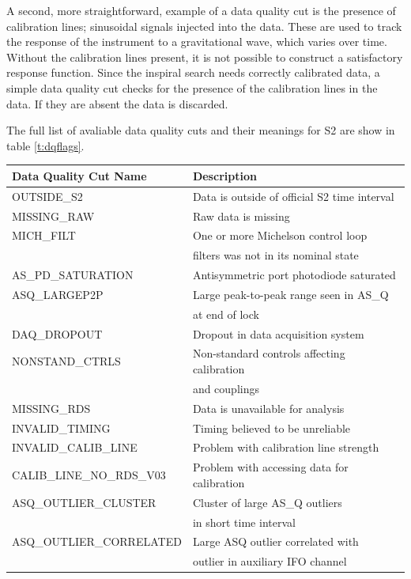 A second, more straightforward, example of a data quality cut is the presence
of calibration lines; sinusoidal signals injected into the data. These are
used to track the response of the instrument to a gravitational wave, which
varies over time. Without the calibration lines present, it is not possible to
construct a satisfactory response function. Since the inspiral search needs
correctly calibrated data, a simple data quality cut checks for the presence of
the calibration lines in the data. If they are absent the data is discarded.

The full list of avaliable data quality cuts and their meanings for S2 are
show in table \ref{t:dqflags}.

\begin{table}
\begin{center}
\begin{tabular}{ll}
Data Quality Cut Name & Description \\\hline
OUTSIDE\_S2   &Data is outside of official S2 time interval \\
MISSING\_RAW  &Raw data is missing \\
MICH\_FILT    &One or more Michelson control loop \\
&filters was not in its nominal state \\
AS\_PD\_SATURATION & Antisymmetric port photodiode saturated \\
ASQ\_LARGEP2P      & Large peak-to-peak range seen in AS\_Q \\
&at end of lock \\
DAQ\_DROPOUT       & Dropout in data acquisition system \\
NONSTAND\_CTRLS    & Non-standard controls affecting calibration\\
&and couplings \\
MISSING\_RDS       & Data is unavailable for analysis \\
INVALID\_TIMING    & Timing believed to be unreliable \\
INVALID\_CALIB\_LINE  & Problem with calibration line strength \\
CALIB\_LINE\_NO\_RDS\_V03 & Problem with accessing data for calibration \\
ASQ\_OUTLIER\_CLUSTER     & Cluster of large AS\_Q outliers \\
&in short time interval \\
ASQ\_OUTLIER\_CORRELATED  & Large ASQ outlier correlated with \\
&outlier in auxiliary IFO channel \\

\end{tabular}
\end{center}
\end{table}
